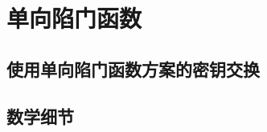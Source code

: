 \section{单向陷门函数}\label{sec:10-2}

\subsection{使用单向陷门函数方案的密钥交换}\label{subsec:10-2-1}

\subsection{数学细节}\label{subsec:10-2-2}